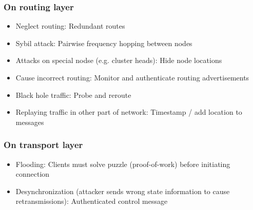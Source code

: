 \subsubsection{On routing layer}

\begin{itemize}
		\item Neglect routing: Redundant routes
		\item Sybil attack: Pairwise frequency hopping between nodes
		\item Attacks on special nodse (e.g. cluster heads): Hide node locations
		\item Cause incorrect routing: Monitor and authenticate routing advertisements
		\item Black hole traffic: Probe and reroute
		\item Replaying traffic in other part of network: Timestamp / add location to messages
\end{itemize}

\subsubsection{On transport layer}

\begin{itemize}
		\item Flooding: Clients must solve puzzle (proof-of-work) before initiating connection
		\item Desynchronization (attacker sends wrong state information to
				cause retransmissions): Authenticated control message
\end{itemize}
